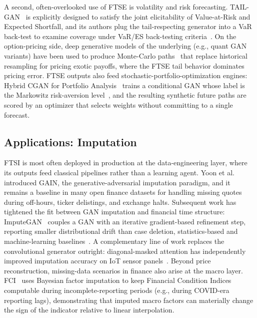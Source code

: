 A second, often-overlooked use of FTSE is volatility and risk
forecasting. TAIL-GAN~\citep{cont2025tailgan} is explicitly designed to
satisfy the joint elicitability of Value-at-Risk and Expected Shortfall,
and its authors plug the tail-respecting generator into a VaR back-test
to examine coverage under VaR/ES back-testing criteria~\citep{acerbi2014expected}. On the option-pricing side,
deep generative models of the underlying (e.g., quant GAN variants) have
been used to produce Monte-Carlo paths~\citep{boyle1977options} that replace historical
resampling for pricing exotic payoffs, where the FTSE tail behavior
dominates pricing error. FTSE outputs also feed
stochastic-portfolio-optimization engines: Hybrid CGAN for Portfolio
Analysis~\citep{lu2022hybrid} trains a conditional GAN whose label is
the Markowitz risk-aversion level~\citep{markowitz1952portfolio}, and the resulting synthetic future
paths are scored by an optimizer that selects weights without committing
to a single forecast.

\subsection{Applications: Imputation}

FTSI is most often deployed in production at the data-engineering
layer, where its outputs feed classical pipelines rather than a learning
agent. Yoon et al.~\citep{yoon2018gain} introduced GAIN, the generative-adversarial
imputation paradigm, and it remains a baseline in many open finance
datasets for handling missing quotes during off-hours, ticker
delistings, and exchange halts. Subsequent work has tightened the fit
between GAN imputation and financial time structure:
ImputeGAN~\citep{qin2023imputegan} couples a GAN with an iterative
gradient-based refinement step, reporting smaller distributional drift
than case deletion, statistics-based and machine-learning
baselines~\citep{vanbuuren1999multiple}. A complementary line of work
replaces the convolutional generator outright: diagonal-masked attention
has independently improved imputation accuracy on IoT sensor
panels~\citep{wang2025attn}. Beyond price reconstruction, missing-data scenarios in
finance also arise at the macro layer.
FCI~\citep{herculano2025financial} uses Bayesian factor imputation to
keep Financial Condition Indices computable during incomplete-reporting
periods (e.g., during COVID-era reporting lags), demonstrating that
imputed macro factors can materially change the sign of the indicator
relative to linear interpolation.

